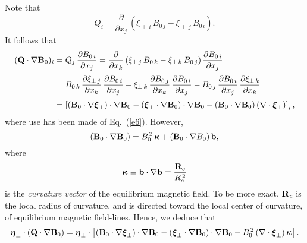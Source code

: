 \documentclass[12pt,prb,aps,notitlepage]{revtex4-1}
\newcommand{\bxi}{\mbox{\boldmath$\xi$}}
\newcommand{\bta}{\mbox{\boldmath$\eta$}}
\newcommand{\bkappa}{\mbox{\boldmath$\kappa$}}
\begin{document}
Note that
\begin{equation}\label{e47}
Q_i = \frac{\partial}{\partial x_j}\,(\xi_{\perp\,i}\,B_{0\,j} - \xi_{\perp\,j}\,B_{0\,i}).
\end{equation}
It follows that
\begin{align}
({\bf Q}\cdot\nabla {\bf B}_0)_i&= Q_j\,\frac{\partial B_{0\,i}}{\partial x_j} 
= \frac{\partial}{\partial x_k}\,(\xi_{\perp\,j}\,B_{0\,k} - \xi_{\perp\,k}\,B_{0\,j})\,\frac{\partial B_{0\,i}}{\partial x_j}\nonumber\\[0.5ex]
&= B_{0\,k}\,\frac{\partial\xi_{\perp\,j}}{\partial x_k}\,\frac{\partial B_{0\,i}}{\partial x_j}-\xi_{\perp\,k}\,\frac{\partial B_{0\,j}}{\partial x_k}\,\frac{\partial B_{0\,i}}{\partial x_j}
-B_{0\,j}\,\frac{\partial B_{0\,i}}{\partial x_j}\,\frac{\partial \xi_{\perp\,k}}{\partial x_k} \nonumber\\[0.5ex]
&= \left[ ({\bf B}_0\cdot
\nabla\bxi_\perp)\cdot\nabla {\bf B}_0 - (\bxi_\perp\cdot \nabla{\bf B}_0)\cdot\nabla {\bf B}_0- ({\bf B}_0\cdot\nabla {\bf B}_0)\,(\nabla\cdot\bxi_\perp)\right]_i,
\end{align}
where use has been made of Eq.~(\ref{e6}). However,
\begin{equation}\label{e49}
({\bf B}_0\cdot\nabla {\bf B}_0) = B_0^{\,2}\,\bkappa+ ({\bf B}_0\cdot\nabla B_0)\,{\bf b},
\end{equation}
where
\begin{equation}
\bkappa \equiv {\bf b}\cdot\nabla {\bf b} = \frac{{\bf R}_c}{R_c^{\,2}}
\end{equation}
is the {\em curvature vector}\/ of the equilibrium magnetic field. To be more exact, ${\bf R}_c$ is the local radius of curvature,
and is directed toward the local center of curvature, of equilibrium magnetic field-lines.
Hence, we deduce that
\begin{equation}\label{e51}
\bta_\perp \cdot({\bf Q}\cdot\nabla {\bf B}_0)= \bta_\perp\cdot\left[({\bf B}_0\cdot
\nabla\bxi_\perp)\cdot\nabla {\bf B}_0 - (\bxi_\perp\cdot \nabla{\bf B}_0)\cdot\nabla {\bf B}_0- B_0^{\,2}\,(\nabla\cdot\bxi_\perp)\,\bkappa\right].
\end{equation}
\end{document}
